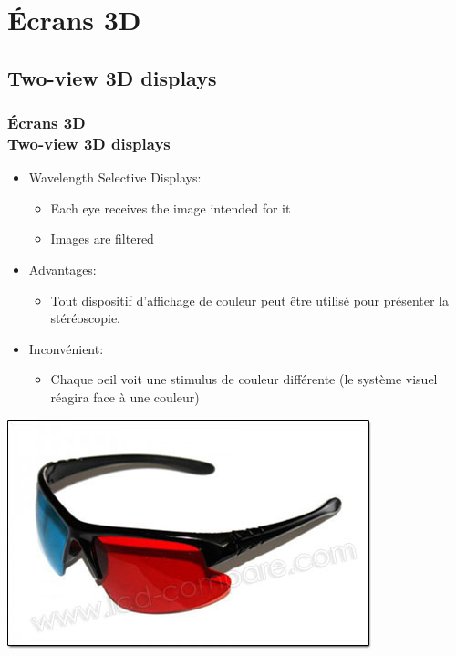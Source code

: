 
\section{Écrans 3D}
\subsection{Two-view 3D displays}
\begin{frame}

  \frametitle{Écrans 3D \\Two-view 3D displays} 
  
  \begin{itemize}
  \item Wavelength Selective Displays:
    
    \begin{itemize}
    \item Each eye receives the image intended for it
    \item Images are filtered	
    \end{itemize}
    
    
    
  \item Advantages:
    \begin{itemize} 	
    \item Tout dispositif d'affichage de couleur peut être utilisé pour présenter la stéréoscopie.
    \end{itemize}
  \item Inconvénient:
    \begin{itemize} 
    \item Chaque oeil voit une stimulus de couleur différente (le système visuel réagira face à une couleur)
    \end{itemize}
  \end{itemize}
  \includegraphics[keepaspectratio,height=.13\linewidth]{1.jpg}
\end{frame}


